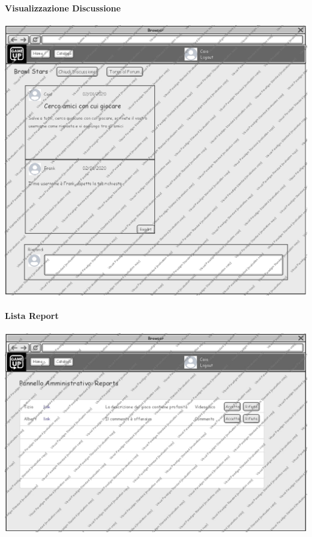 \paragraph{Visualizzazione Discussione}
\begin{center}
\includegraphics[width=\textwidth,height=\textheight,keepaspectratio]{Figure/Mockups/Discussione.jpg}
\end{center}

\newpage
\paragraph{Lista Report}
\begin{center}
\includegraphics[width=\textwidth,height=\textheight,keepaspectratio]{Figure/Mockups/DettagliReport.jpg}
\end{center}

